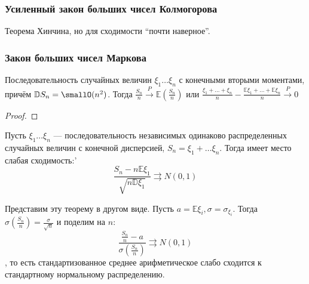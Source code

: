 \subsubsection{Усиленный закон больших чисел Колмогорова}

Теорема Хинчина, но для сходимости ``почти наверное''.

\subsubsection{Закон больших чисел Маркова}

\begin{theorem}
    Последовательность случайных величин \(\xi_1 \dots \xi_n\) с конечными вторыми моментами, причём \(\mathbb{D}S_n = \smallO(n^2)\). Тогда \(\frac{S_n}{n} \xrightarrow{P} \mathbb{E}\left( \frac{S_n}{n} \right)\) или \(\frac{\xi_1 + \dots + \xi_n}{n} - \frac{\mathbb{E}\xi_1 + \dots + \mathbb{E}\xi_n}{n} \xrightarrow{P} 0 \)
\end{theorem}
\begin{proof}
    \unfinished
\end{proof}

\begin{theorem}
    Пусть \(\xi_1 \dots \xi_n\) --- последовательность независимых одинаково распределенных случайных величин с конечной дисперсией, \(S_n = \xi_1 + \dots \xi_n\). Тогда имеет место слабая сходимость:'
    \[\frac{S_n - n \mathbb{E}\xi_1}{\sqrt{n \mathbb{D}\xi_1}} \rightrightarrows N(0, 1)\]
\end{theorem}
\begin{remark}
    Представим эту теорему в другом виде. Пусть \(a = \mathbb{E}\xi_i, \sigma = \sigma_{\xi_i}\). Тогда \(\sigma\left( \frac{S_n}{n} \right) = \frac{\sigma}{\sqrt{n}}\) и поделим на \(n\):
    \[\frac{\frac{S_n}{n} - a}{\sigma\left( \frac{S_n}{n} \right)} \rightrightarrows N(0, 1)\]
    , то есть стандартизованное среднее арифметическое слабо сходится к стандартному нормальному распределению.
\end{remark}